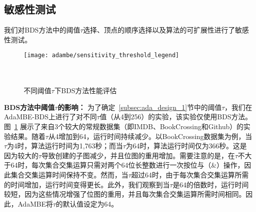 
\subsection{敏感性测试}
\label{subsec:ada_eval_sensitivity}

我们对BDS方法中的阈值$\tau$选择、顶点的顺序选择以及算法的可扩展性进行了敏感性测试。

\begin{figure} [H]
	\vspace{-0.1in}
	\centering
  \texttt{[image: adambe/sensitivity\_threshold\_legend]} \\
	
	\\
	\\

	\caption{不同阈值$\tau$下BDS方法性能评估}
	\label{fig:ada_sensitivity_threshold}

\end{figure}



\textbf{BDS方法中阈值$\tau$的影响：} 为了确定~\ref{subsec:ada_design_1}节中的阈值$\tau$，我们在AdaMBE-BDS上进行了对不同$\tau$值（从4到256）的实验，该实验仅使用BDS方法。图~\ref{fig:ada_sensitivity_threshold} 展示了来自3个较大的常规数据集（即IMDB、BookCrossing和Github）的实验结果。随着$\tau$从4增加到64，运行时间持续减少。以BookCrossing数据集为例，当$\tau$为4时，算法运行时间为1,763秒；而当$\tau$为64时，算法运行时间仅为366秒。这是因为较大的$\tau$导致创建的子图减少，并且位图的重用增加。需要注意的是，在$\tau$不大于64时，每次集合交集运算只需对两个64位长整数进行一次按位与（\&）操作，因此集合交集运算时间保持不变。然而，当$\tau$超过64时，由于每次集合交集运算所需的时间增加，运行时间变得更长。此外，我们观察到当$\tau$是64的倍数时，运行时间较短，因为这些情况增强了位图的重用，并且每次集合交集运算所需时间相同。因此，AdaMBE将$\tau$的默认值设定为64。




